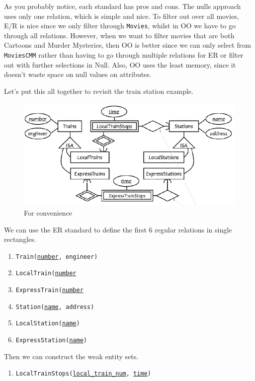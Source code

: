   As you probably notice, each standard has pros and cons. The nulls approach uses only one relation, which is simple and nice. To filter out over all movies, E/R is nice since we only filter through \texttt{Movies}, whilst in OO we have to go through all relations. However, when we want to filter movies that are both Cartoons and Murder Mysteries, then OO is better since we can only select from \texttt{MoviesCMM} rather than having to go through multiple relations for ER or filter out with further selections in Null. Also, OO uses the least memory, since it doesn't waste space on null values on attributes.  


  \begin{example}
    Let's put this all together to revisit the train station example. 
    \begin{figure}[H]
      \centering 
      \includegraphics[scale=0.4]{img/final_station.png}
      \caption{For convenience} 
      \label{fig:final_station}
    \end{figure}
    We can use the ER standard to define the first 6 regular relations in single rectangles.  
    \begin{enumerate}
      \item \texttt{Train(\underline{number}, engineer)}
      \item \texttt{LocalTrain(\underline{number}}
      \item \texttt{ExpressTrain(\underline{number}}
      \item \texttt{Station(\underline{name}, address)}
      \item \texttt{LocalStation(\underline{name})}
      \item \texttt{ExpressStation(\underline{name})}
    \end{enumerate}
    Then we can construct the weak entity sets. 
    \begin{enumerate}
      \item \texttt{LocalTrainStops(\underline{local\_train\_num}, \underline{time})}

\end{enumerate}
\end{example}
